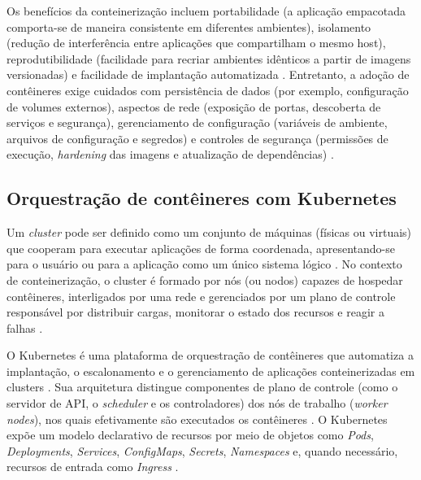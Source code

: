 Os benefícios da conteinerização incluem portabilidade (a aplicação empacotada comporta-se de maneira consistente em diferentes ambientes), isolamento (redução de interferência entre aplicações que compartilham o mesmo host), reprodutibilidade (facilidade para recriar ambientes idênticos a partir de imagens versionadas) e facilidade de implantação automatizada \cite{docker2026documentation}. Entretanto, a adoção de contêineres exige cuidados com persistência de dados (por exemplo, configuração de volumes externos), aspectos de rede (exposição de portas, descoberta de serviços e segurança), gerenciamento de configuração (variáveis de ambiente, arquivos de configuração e segredos) e controles de segurança (permissões de execução, \textit{hardening} das imagens e atualização de dependências) \cite{docker2026documentation,kubernetes2026documentation}.



\subsection{Orquestração de contêineres com Kubernetes}

Um \textit{cluster} pode ser definido como um conjunto de máquinas (físicas ou virtuais) que cooperam para executar aplicações de forma coordenada, apresentando-se para o usuário ou para a aplicação como um único sistema lógico \cite{tanenbaum2017}. No contexto de conteinerização, o cluster é formado por nós (ou nodos) capazes de hospedar contêineres, interligados por uma rede e gerenciados por um plano de controle responsável por distribuir cargas, monitorar o estado dos recursos e reagir a falhas \cite{kubernetes2026documentation}.

O Kubernetes é uma plataforma de orquestração de contêineres que automatiza a implantação, o escalonamento e o gerenciamento de aplicações conteinerizadas em clusters \cite{kubernetes2026documentation,burns2019}. Sua arquitetura distingue componentes de plano de controle (como o servidor de API, o \textit{scheduler} e os controladores) dos nós de trabalho (\textit{worker nodes}), nos quais efetivamente são executados os contêineres \cite{kubernetes2026documentation}. O Kubernetes expõe um modelo declarativo de recursos por meio de objetos como \textit{Pods}, \textit{Deployments}, \textit{Services}, \textit{ConfigMaps}, \textit{Secrets}, \textit{Namespaces} e, quando necessário, recursos de entrada como \textit{Ingress} \cite{kubernetes2026documentation}.

